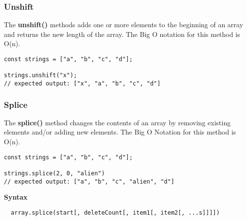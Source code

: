 \subsubsection{Unshift}
The \textbf{unshift()} methods adds one or more elements to the beginning of an array and returns the new length of the array. The Big O notation for this method is O(n).

\begin{lstlisting}
const strings = ["a", "b", "c", "d"];

strings.unshift("x");
// expected output: ["x", "a", "b", "c", "d"]
\end{lstlisting}

\subsubsection{Splice}
The \textbf{splice()} method changes the contents of an array by removing existing elements and/or adding new elements. The Big O Notation for this method is O(n).

\begin{lstlisting}
const strings = ["a", "b", "c", "d"];

strings.splice(2, 0, "alien")
// expected output: ["a", "b", "c", "alien", "d"]
\end{lstlisting}

\textbf{Syntax}
\begin{lstlisting}
  array.splice(start[, deleteCount[, item1[, item2[, ...s]]]])
\end{lstlisting}

\newpage
